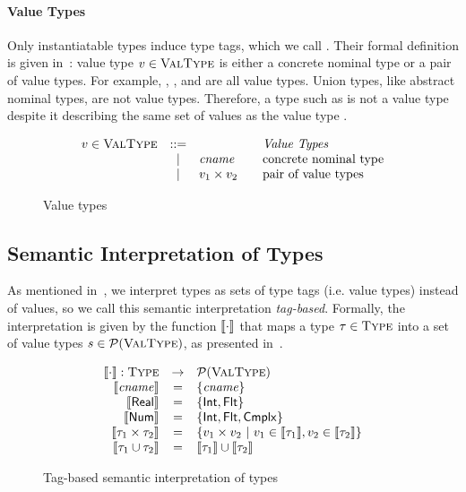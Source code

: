 \paragraph{Value Types}
Only instantiatable types induce type tags,
which we call . 
Their formal definition is given in~:
value type $v \in \textsc{ValType}$ is either a concrete nominal type 
or a pair of value types. 
For example, \tyflt, \typair{\tyint}{\tyint},
and \typair{\tystr}{(\typair{\tyint}{\tyint})} are all value types.
Union types, like abstract nominal types, are not value types.
Therefore, a type such as \tyunion{\tyint}{\tyint} is not a value type 
despite it describing the same set of values as the value type \tyint.

\begin{figure}
	\[
	\begin{array}{rcl@{\qquad}l}
	\vty \in \VType & ::= & & \text{\emph{Value Types}}
	\\ &\Alt& \cname & \text{concrete nominal type}
	\\ &\Alt& \typair{\vty_1}{\vty_2} & \text{pair of value types}
	\end{array}
	\]
	\caption{Value types} %
	\label{fig:bjsem-value-types}
\end{figure}


\subsection{Semantic Interpretation of Types}

As mentioned in~, 
we interpret types as sets of type tags (i.e. value types) instead of values,
so we call this semantic interpretation \emph{tag-based}.
Formally, the interpretation is given by the function
$\llbracket \cdot \rrbracket$ that maps a type $\tau \in \textsc{Type}$
into a set of value types $s \in \mathcal{P}(\textsc{ValType})$,
as presented in~.

\begin{figure}
	\[
	\begin{array}{rcl}
	\llbracket \cdot \rrbracket: \textsc{Type} &\rightarrow& \mathcal{P}(\textsc{ValType}) \\
	\llbracket \mathit{cname} \rrbracket  & = & \{\mathit{cname}\} \\
	\llbracket \mathsf{Real} \rrbracket & = & \{ \mathsf{Int}, \mathsf{Flt} \} \\
	\llbracket \mathsf{Num} \rrbracket & = & \{ \mathsf{Int}, \mathsf{Flt}, \mathsf{Cmplx} \} \\
	\llbracket \tau_1 \times \tau_2 \rrbracket & = & \{v_1 \times v_2 
	~\vert~ v_1 \in \llbracket \tau_1 \rrbracket, v_2 \in \llbracket \tau_2 \rrbracket\}\\
	\llbracket \tau_1 \cup \tau_2 \rrbracket & = & 
	\llbracket \tau_1 \rrbracket \cup \llbracket \tau_2 \rrbracket
	\end{array}
	\]
	\caption{Tag-based semantic interpretation of types} %
	\label{fig:bjsem-interpretation}
\end{figure}

